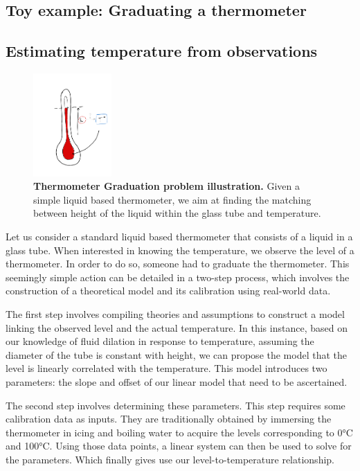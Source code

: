 \begin{bibunit}
  \section{Toy example: Graduating a thermometer}


\subsection*{Estimating temperature from observations}
\begin{figure}[h]
    \centering
        \includegraphics[clip, width=3cm]{Introduction/pics/therm_pb.png}
    \caption{\textbf{Thermometer Graduation problem illustration.} Given a simple liquid based thermometer, we aim at finding the matching between height of the liquid within the glass tube and temperature.}
    \label{fig:therm_calib}
\end{figure}

Let us consider a standard liquid based thermometer that consists of a liquid in a glass tube.
When interested in knowing the temperature, we observe the level of a thermometer.
In order to do so, someone had to graduate the thermometer. 
This seemingly simple action can be detailed in a two-step process, which involves the construction of a theoretical model and its calibration using real-world data.

The first step involves compiling theories and assumptions to construct a model linking the observed level and the actual temperature.
In this instance, based on our knowledge of fluid dilation in response to temperature, assuming the diameter of the tube is constant with height, we can propose the model that the level is linearly correlated with the temperature.
This model introduces two parameters: the slope and offset of our linear model that need to be ascertained.

The second step involves determining these parameters. This step requires some calibration data as inputs. They are traditionally obtained by immersing the thermometer in icing and boiling water to acquire the levels corresponding to 0°C and 100°C.
  Using those data points, a linear system can then be used to solve for the parameters. Which finally gives use our level-to-temperature relationship.



\end{bibunit}
